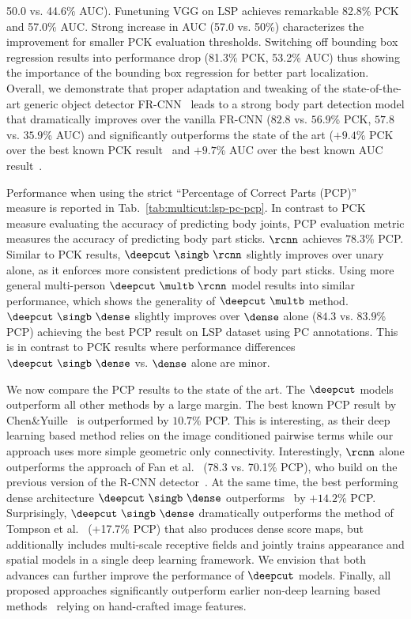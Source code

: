 50.0 vs. 44.6\% AUC). Funetuning VGG on LSP achieves remarkable 82.8\%
PCK and 57.0\% AUC. Strong increase in AUC (57.0 vs. 50\%)
characterizes the improvement for smaller PCK evaluation
thresholds. Switching off bounding box regression results into
performance drop (81.3\% PCK, 53.2\% AUC) thus showing the importance
of the bounding box regression for better part localization. Overall,
we demonstrate that proper adaptation and tweaking of the
state-of-the-art generic object detector
FR-CNN~\cite{girshickICCV15fastrcnn} leads to a strong body part
detection model that dramatically improves over the vanilla FR-CNN
($82.8$ vs. $56.9$\% PCK, $57.8$ vs. $35.9$\% AUC) and significantly
outperforms the state of the art ($+9.4$\% PCK over the best known PCK
result~\cite{chen14nips} and $+9.7$\% AUC over the best known AUC
result~\cite{tompson14nips}.



Performance when using the strict ``Percentage of Correct Parts
(PCP)''~\cite{Ferrari:2008:PSS} measure is reported in
Tab.~\ref{tab:multicut:lsp-pc-pcp}. In contrast to PCK measure
evaluating the accuracy of predicting body joints, PCP evaluation
metric measures the accuracy of predicting body part sticks. $\rcnn$
achieves $78.3$\% PCP. Similar to PCK results, $\deepcut~\singb~\rcnn$
slightly improves over unary alone, as it enforces more consistent
predictions of body part sticks. Using more general multi-person
$\deepcut~\multb~\rcnn$ model results into similar performance, which
shows the generality of $\deepcut~\multb$
method. $\deepcut~\singb~\dense$ slightly improves over $\dense$ alone
($84.3$ vs. $83.9$\% PCP) achieving the best PCP result on LSP dataset
using PC annotations. This is in contrast to PCK results where
performance differences $\deepcut~\singb~\dense$ vs. $\dense$ alone
are minor.

We now compare the PCP results to the state of the art. The $\deepcut$
models outperform all other methods by a large margin. The best known
PCP result by Chen\&Yuille~\cite{chen14nips} is outperformed by
$10.7$\% PCP. This is interesting, as their deep learning based
method relies on the image conditioned pairwise terms while our
approach uses more simple geometric only connectivity. Interestingly,
$\rcnn$ alone outperforms the approach of Fan et al.~\cite{fan15cvpr}
(78.3 vs. 70.1\% PCP), who build on the previous version of the R-CNN
detector~\cite{girshick2014rcnn}. At the same time, the best
performing dense architecture $\deepcut~\singb~\dense$
outperforms~\cite{fan15cvpr} by $+14.2$\% PCP. Surprisingly,
$\deepcut~\singb~\dense$ dramatically outperforms the method of
Tompson et al.~\cite{tompson14nips} (+17.7\% PCP) that also produces
dense score maps, but additionally includes multi-scale receptive
fields and jointly trains appearance and spatial models in a single
deep learning framework. We envision that both advances can further
improve the performance of $\deepcut$ models. Finally, all proposed
approaches significantly outperform earlier non-deep learning based
methods~\cite{wang13cvpr,pishchulin13iccv} relying on hand-crafted
image features.

